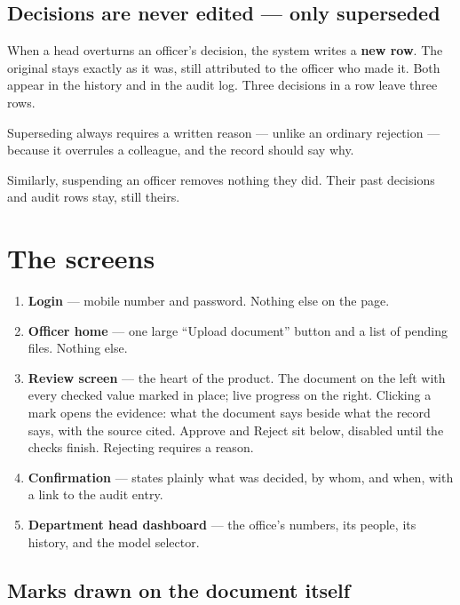 \documentclass[11pt,a4paper]{article}
\begin{document}
\subsection{Decisions are never edited --- only superseded}

When a head overturns an officer's decision, the system writes a
\textbf{new row}. The original stays exactly as it was, still attributed to the
officer who made it. Both appear in the history and in the audit log. Three
decisions in a row leave three rows.

Superseding always requires a written reason --- unlike an ordinary rejection ---
because it overrules a colleague, and the record should say why.

Similarly, suspending an officer removes nothing they did. Their past decisions
and audit rows stay, still theirs.

\newpage

\section{The screens}

\begin{enumerate}
  \item \textbf{Login} --- mobile number and password. Nothing else on the page.
  \item \textbf{Officer home} --- one large ``Upload document'' button and a list
        of pending files. Nothing else.
  \item \textbf{Review screen} --- the heart of the product. The document on the
        left with every checked value marked in place; live progress on the
        right. Clicking a mark opens the evidence: what the document says beside
        what the record says, with the source cited. Approve and Reject sit
        below, disabled until the checks finish. Rejecting requires a reason.
  \item \textbf{Confirmation} --- states plainly what was decided, by whom, and
        when, with a link to the audit entry.
  \item \textbf{Department head dashboard} --- the office's numbers, its people,
        its history, and the model selector.
\end{enumerate}

\subsection{Marks drawn on the document itself}
\end{document}

